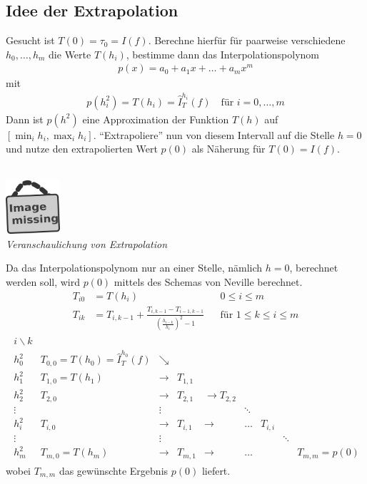 \documentclass[ngerman,fontsize=11pt, paper=a4, parskip=half, titlepage=true, toc=bib]{scrbook}
\theoremstyle{definition}
\theoremstyle{plain}
\newcommand{\subsectione}[1]{\addtocounter{Def}{1}\subsection{#1}}
\newcommand{\imagemissing}[1]{
  \begin{center}~\\
    \centering 
    \includegraphics[width=2cm]{images/image_missing.jpg}\\
    \textit{#1} \\
  \end{center}
}
\begin{document}

\subsectione{Idee der Extrapolation}
Gesucht ist $T(0)= \tau_0=I(f)$.
Berechne hierfür für paarweise
verschiedene 
$h_0,\ldots, h_m$ die Werte
$T(h_i)$,
bestimme dann das
Interpolationspolynom
\begin{gather}
  p(x) = a_0+a_1x+\ldots+a_mx^m
  \label{VII.3.4}
\end{gather}
mit 
\begin{gather}
  p(h_i^2) =
  T(h_i)=\hat{I}_T^{h_i}(f)
  \quad \text{für } i=0,\ldots,m
  \label{VII.3.5}
\end{gather}
Dann ist $p(h^2)$ eine Approximation
der Funktion $T(h)$
auf $[\min_ih_i,\max_ih_i]$.
\enquote{Extrapoliere} nun von
diesem Intervall
auf die Stelle $h=0$ und nutze
den extrapolierten Wert $p(0)$ als
Näherung für $T(0)=I(f)$.

\imagemissing{Veranschaulichung von Extrapolation}

Da das Interpolationspolynom nur an einer Stelle,
nämlich $h=0$, berechnet werden soll,
wird $p(0)$ mittels des Schemas von Neville berechnet.
\begin{align}\nonumber
  T_{i0} &= T(h_i) &&0\leq i\leq m \\
  T_{ik} &= T_{i,k-1} 
           + \frac{T_{i,k-1}-T_{i-1,k-1}}
           {\left(\frac{h_{i-k}}{h_i}\right)^2-1} 
                   &&\text{für } 1\leq k\leq i\leq m
                      \label{VII.3.6}
\end{align}
\begin{align*}
  \begin{array}{clccccccl}
    i\backslash k \\
    h_0^2 & T_{0,0}=T(h_0)=\hat{I}_T^{h_0}(f) & \searrow \\
    h_1^2 & T_{1,0}=T(h_1) & \longrightarrow & T_{1,1}\\
    h_2^2 & T_{2,0}& \longrightarrow &T_{2,1} & \longrightarrow T_{2,2} \\
    \vdots&&\vdots&&& \ddots\\
    h_i^2 & T_{i,0} & \longrightarrow & T_{i,1} & \longrightarrow & \ldots &
                                                                             T_{i,i}\\
    \vdots&&\vdots&&&&& \ddots\\
    h_m^2 & T_{m,0}=T(h_m)&\longrightarrow & T_{m,1} &\longrightarrow &\ldots&&&T_{m,m}=p(0)
  \end{array}
\end{align*}
wobei $T_{m,m}$ das gewünschte Ergebnis $p(0)$ liefert.
\end{document}
